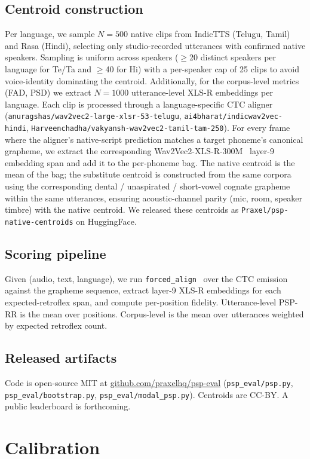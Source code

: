 \documentclass[conference,a4paper]{IEEEtran}
\newcommand{\psp}{\textsc{PSP}}
\begin{document}
\subsection{Centroid construction}
Per language, we sample $N{=}500$ native clips from IndicTTS (Telugu, Tamil) and Rasa (Hindi), selecting only studio-recorded utterances with confirmed native speakers. Sampling is uniform across speakers ($\geq$20 distinct speakers per language for Te/Ta and $\geq$40 for Hi) with a per-speaker cap of 25 clips to avoid voice-identity dominating the centroid. Additionally, for the corpus-level metrics (FAD, PSD) we extract $N{=}1000$ utterance-level XLS-R embeddings per language. Each clip is processed through a language-specific CTC aligner (\texttt{anuragshas/wav2vec2-large-xlsr-53-telugu}, \texttt{ai4bharat/indicwav2vec-hindi}, \texttt{Harveenchadha/vakyansh-wav2vec2-tamil-tam-250}). For every frame where the aligner's native-script prediction matches a target phoneme's canonical grapheme, we extract the corresponding Wav2Vec2-XLS-R-300M~\cite{babu2021xlsr} layer-9 embedding span and add it to the per-phoneme bag. The native centroid is the mean of the bag; the substitute centroid is constructed from the same corpora using the corresponding dental / unaspirated / short-vowel cognate grapheme within the same utterances, ensuring acoustic-channel parity (mic, room, speaker timbre) with the native centroid. We released these centroids as \texttt{Praxel/psp-native-centroids} on HuggingFace.

\subsection{Scoring pipeline}
Given (audio, text, language), we run \texttt{forced\_align}~\cite{torchaudio} over the CTC emission against the grapheme sequence, extract layer-9 XLS-R embeddings for each expected-retroflex span, and compute per-position fidelity. Utterance-level \psp{}-RR is the mean over positions. Corpus-level is the mean over utterances weighted by expected retroflex count.

\subsection{Released artifacts}
Code is open-source MIT at \url{github.com/praxelhq/psp-eval} (\texttt{psp\_eval/psp.py}, \texttt{psp\_eval/bootstrap.py}, \texttt{psp\_eval/modal\_psp.py}). Centroids are CC-BY. A public leaderboard is forthcoming.

\section{Calibration}
\label{sec:calibration}
\end{document}
